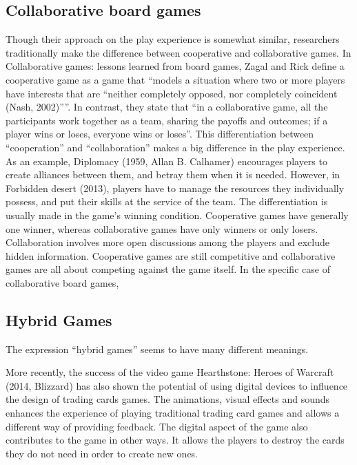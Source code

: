  \subsection{Collaborative board games}

Though their approach on the play experience is somewhat similar, researchers traditionally make the difference between cooperative and collaborative games. In Collaborative games: lessons learned from board games, Zagal and Rick define a cooperative game as a game that “models a situation where two or more players have interests that are “neither completely opposed, nor completely coincident (Nash, 2002)””. In contrast, they state that “in a collaborative game, all the participants work together as a team, sharing the payoffs and outcomes; if a player wins or loses, everyone wins or loses”. This differentiation between “cooperation” and “collaboration” makes a big difference in the play experience. As an example, Diplomacy (1959, Allan B. Calhamer) encourages players to create alliances between them, and betray them when it is needed. However, in Forbidden desert (2013), players have to manage the resources they individually possess, and put their skills at the service of the team. 
The differentiation is usually made in the game’s winning condition. Cooperative games have generally one winner, whereas collaborative games have only winners or only losers. Collaboration involves more open discussions among the players and exclude hidden information. Cooperative games are still competitive and collaborative games are all about competing against the game itself. 
In the specific case of collaborative board games, 


\subsection{Hybrid Games}

The expression “hybrid games” seems to have many different meanings. 









More recently, the success of the video game Hearthstone: Heroes of Warcraft (2014, Blizzard) has also shown the potential of using digital devices to influence the design of trading cards games. The animations, visual effects and sounds enhances the experience of playing traditional trading card games and allows a different way of providing feedback. The digital aspect of the game also contributes to the game in other ways. It allows the players to destroy the cards they do not need in order to create new ones.